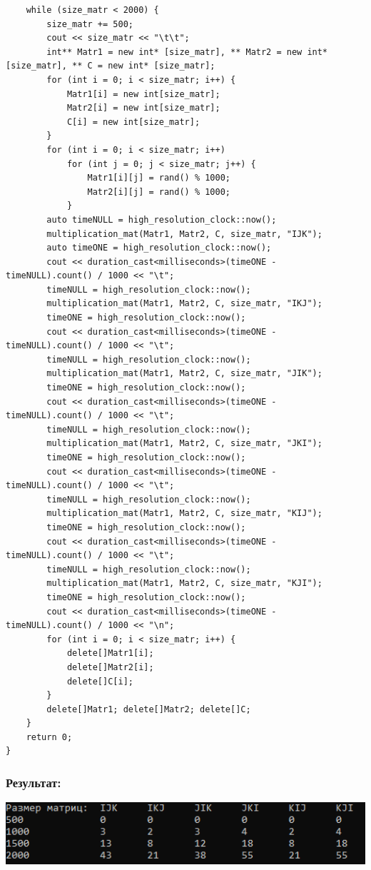 \documentclass[a4paper]{article}
\begin{document}
\begin{verbatim}
    while (size_matr < 2000) {
        size_matr += 500;
        cout << size_matr << "\t\t";
        int** Matr1 = new int* [size_matr], ** Matr2 = new int* [size_matr], ** C = new int* [size_matr];
        for (int i = 0; i < size_matr; i++) {
            Matr1[i] = new int[size_matr];
            Matr2[i] = new int[size_matr];
            C[i] = new int[size_matr];
        }
        for (int i = 0; i < size_matr; i++)
            for (int j = 0; j < size_matr; j++) {
                Matr1[i][j] = rand() % 1000;
                Matr2[i][j] = rand() % 1000;
            }
        auto timeNULL = high_resolution_clock::now();
        multiplication_mat(Matr1, Matr2, C, size_matr, "IJK");
        auto timeONE = high_resolution_clock::now();
        cout << duration_cast<milliseconds>(timeONE - timeNULL).count() / 1000 << "\t";
        timeNULL = high_resolution_clock::now();
        multiplication_mat(Matr1, Matr2, C, size_matr, "IKJ");
        timeONE = high_resolution_clock::now();
        cout << duration_cast<milliseconds>(timeONE - timeNULL).count() / 1000 << "\t";
        timeNULL = high_resolution_clock::now();
        multiplication_mat(Matr1, Matr2, C, size_matr, "JIK");
        timeONE = high_resolution_clock::now();
        cout << duration_cast<milliseconds>(timeONE - timeNULL).count() / 1000 << "\t";
        timeNULL = high_resolution_clock::now();
        multiplication_mat(Matr1, Matr2, C, size_matr, "JKI");
        timeONE = high_resolution_clock::now();
        cout << duration_cast<milliseconds>(timeONE - timeNULL).count() / 1000 << "\t";
        timeNULL = high_resolution_clock::now();
        multiplication_mat(Matr1, Matr2, C, size_matr, "KIJ");
        timeONE = high_resolution_clock::now();
        cout << duration_cast<milliseconds>(timeONE - timeNULL).count() / 1000 << "\t";
        timeNULL = high_resolution_clock::now();
        multiplication_mat(Matr1, Matr2, C, size_matr, "KJI");
        timeONE = high_resolution_clock::now();
        cout << duration_cast<milliseconds>(timeONE - timeNULL).count() / 1000 << "\n";
        for (int i = 0; i < size_matr; i++) {
            delete[]Matr1[i];
            delete[]Matr2[i];
            delete[]C[i];
        }
        delete[]Matr1; delete[]Matr2; delete[]C;
    }
    return 0;
}
\end{verbatim}\normalsize
\subsubsection{Результат:}
\includegraphics[width=1\textwidth]{4_2.png}
\end{document}
